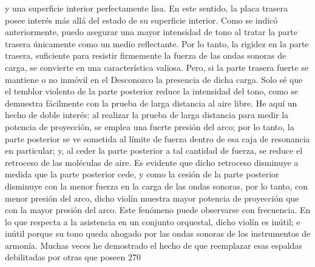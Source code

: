 y una superficie interior perfectamente lisa. En este sentido, la placa trasera posee interés más allá del estado de su superficie interior. Como se indicó anteriormente, puedo asegurar una mayor intensidad de tono al tratar la parte trasera únicamente como un medio reflectante. Por lo tanto, la rigidez en la parte trasera, suficiente para resistir firmemente la fuerza de las ondas sonoras de carga, se convierte en una característica valiosa. Pero, si la parte trasera fuerte se mantiene o no inmóvil en el
Desconozco la presencia de dicha carga. Solo sé que el temblor violento de la parte posterior reduce la intensidad del tono, como se demuestra fácilmente con la prueba de larga distancia al aire libre. He aquí un hecho de doble interés: al realizar la prueba de larga distancia para medir la potencia de proyección, se emplea una fuerte presión del arco; por lo tanto, la parte posterior se ve sometida al límite de fuerza dentro de esa caja de resonancia en particular; y, al ceder la parte posterior a tal cantidad de fuerza, se reduce el retroceso de las moléculas de aire. Es evidente que dicho retroceso disminuye a medida que la parte posterior cede, y como la cesión de la parte posterior disminuye con la menor fuerza en la carga de las ondas sonoras, por lo tanto, con menor presión del arco, dicho violín muestra mayor potencia de proyección que con la mayor presión del arco. Este fenómeno puede observarse con frecuencia. En lo que respecta a la asistencia en un conjunto orquestal, dicho violín es inútil; e inútil porque su tono queda ahogado por las ondas sonoras de los instrumentos de armonía.
Muchas veces he demostrado el hecho de que reemplazar esas espaldas debilitadas por otras que poseen 270

